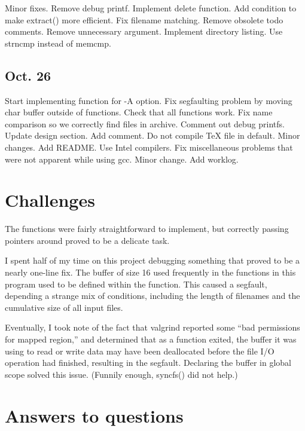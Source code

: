\documentclass[12pt,letterpaper]{article}
\begin{document}
\begin{itemize}
Minor fixes.
Remove debug printf.
Implement delete function.
Add condition to make extract() more efficient.
Fix filename matching.
Remove obsolete todo comments.
Remove unnecessary argument.
Implement directory listing.
Use strncmp instead of memcmp.
\end{itemize}

\subsection*{Oct. 26}

\begin{itemize}
Start implementing function for -A option.
Fix segfaulting problem by moving char buffer outside of functions.
Check that all functions work.
Fix name comparison so we correctly find files in archive.
Comment out debug printfs.
Update design section.
Add comment.
Do not compile TeX file in default.
Minor changes.
Add README.
Use Intel compilers.
Fix miscellaneous problems that were not apparent while using gcc.
Minor change.
Add worklog.
\end{itemize}


\section*{Challenges}

The functions were fairly straightforward to implement, but correctly passing
pointers around proved to be a delicate task.

I spent half of my time on this project debugging something that proved to be
a nearly one-line fix. The buffer of size 16 used frequently in the functions
in this program used to be defined within the function. This caused a segfault,
depending a strange mix of conditions, including the length of filenames and
the cumulative size of all input files.

Eventually, I took note of the fact that valgrind reported some ``bad
permissions for mapped region,'' and determined that as a function exited, the
buffer it was using to read or write data may have been deallocated before the
file I/O operation had finished, resulting in the segfault. Declaring the
buffer in global scope solved this issue. (Funnily enough, syncfs() did not
help.)


\section*{Answers to questions}
\end{document}
